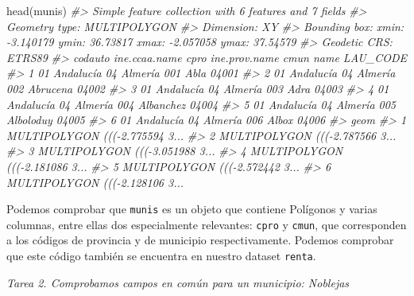 \documentclass[
]{report}
\newenvironment{Shaded}{\begin{snugshade}}{\end{snugshade}}
\newcommand{\CommentTok}[1]{\textcolor[rgb]{0.56,0.35,0.01}{\textit{#1}}}
\newcommand{\FunctionTok}[1]{\textcolor[rgb]{0.00,0.00,0.00}{#1}}
\newcommand{\NormalTok}[1]{#1}
\theoremstyle{definition}
\theoremstyle{definition}
\theoremstyle{definition}
\theoremstyle{definition}
\theoremstyle{remark}
\begin{document}
\begin{Shaded}
\begin{Highlighting}[]
\FunctionTok{head}\NormalTok{(munis)}
\CommentTok{\#\textgreater{} Simple feature collection with 6 features and 7 fields}
\CommentTok{\#\textgreater{} Geometry type: MULTIPOLYGON}
\CommentTok{\#\textgreater{} Dimension:     XY}
\CommentTok{\#\textgreater{} Bounding box:  xmin: {-}3.140179 ymin: 36.73817 xmax: {-}2.057058 ymax: 37.54579}
\CommentTok{\#\textgreater{} Geodetic CRS:  ETRS89}
\CommentTok{\#\textgreater{}   codauto ine.ccaa.name cpro ine.prov.name cmun      name LAU\_CODE}
\CommentTok{\#\textgreater{} 1      01     Andalucía   04       Almería  001      Abla    04001}
\CommentTok{\#\textgreater{} 2      01     Andalucía   04       Almería  002  Abrucena    04002}
\CommentTok{\#\textgreater{} 3      01     Andalucía   04       Almería  003      Adra    04003}
\CommentTok{\#\textgreater{} 4      01     Andalucía   04       Almería  004 Albanchez    04004}
\CommentTok{\#\textgreater{} 5      01     Andalucía   04       Almería  005 Alboloduy    04005}
\CommentTok{\#\textgreater{} 6      01     Andalucía   04       Almería  006     Albox    04006}
\CommentTok{\#\textgreater{}                             geom}
\CommentTok{\#\textgreater{} 1 MULTIPOLYGON ((({-}2.775594 3...}
\CommentTok{\#\textgreater{} 2 MULTIPOLYGON ((({-}2.787566 3...}
\CommentTok{\#\textgreater{} 3 MULTIPOLYGON ((({-}3.051988 3...}
\CommentTok{\#\textgreater{} 4 MULTIPOLYGON ((({-}2.181086 3...}
\CommentTok{\#\textgreater{} 5 MULTIPOLYGON ((({-}2.572442 3...}
\CommentTok{\#\textgreater{} 6 MULTIPOLYGON ((({-}2.128106 3...}
\end{Highlighting}
\end{Shaded}

Podemos comprobar que \texttt{munis} es un objeto que contiene Polígonos y varias
columnas, entre ellas dos especialmente relevantes: \texttt{cpro} y \texttt{cmun}, que
corresponden a los códigos de provincia y de municipio respectivamente. Podemos
comprobar que este código también se encuentra en nuestro dataset \texttt{renta}.

\emph{Tarea 2. Comprobamos campos en común para un municipio: Noblejas}
\end{document}
